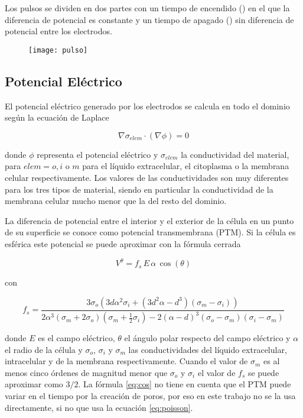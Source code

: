Los pulsos se dividen en dos partes con un tiempo de encendido (\ontime) en el que la diferencia de potencial es constante y un tiempo de apagado (\offtime) sin diferencia de potencial entre los electrodos.

\begin{figure}[h]
	\centering
	\texttt{[image: pulso]}
\end{figure}


\subsection*{Potencial Eléctrico}
El potencial eléctrico generado por los electrodos se calcula en todo el dominio según la ecuación de Laplace \cite[p.~88]{c9-fem-electro}

\begin{equation} \label{eq:poisson}
	\nabla \sigma_{elem} \cdot (\nabla \phi) = 0 
\end{equation}

donde $\phi$ representa el potencial eléctrico y $\sigma_{elem}$ la conductividad del material, para $elem = o, i$ o $m$ para el líquido extracelular, el citoplasma o la membrana celular respectivamente. Los valores de las conductividades son muy diferentes para los tres tipos de material, siendo en particular la conductividad de la membrana celular mucho menor que la del resto del dominio.

La diferencia de potencial entre el interior y el exterior de la célula en un punto de su superficie se conoce como potencial transmembrana (PTM). Si la célula es esférica este potencial se puede aproximar con la fórmula cerrada \cite{tsong}

\begin{equation} \label{eq:cos}
	 V^{\theta} = f_s\, E\, \alpha\, \cos (\theta) 
\end{equation}

con

\begin{equation} \label{eq:lambda}
    f_s = \frac{3\sigma_o \left( 3 d \alpha^2 \sigma_i + \left( 3 d^2 \alpha - d^3 \right) \left(\sigma_m - \sigma_i \right) \right)}{2 \alpha^3 \left( \sigma_m + 2 \sigma_o \right) \left(\sigma_m + \frac{1}{2} \sigma_i \right) - 2 \left(\alpha - d \right)^3 \left(\sigma_o - \sigma_m \right) \left( \sigma_i - \sigma_m \right)}
\end{equation}

donde $E$ es el campo eléctrico, $\theta$ el ángulo polar respecto del campo eléctrico y $\alpha$ el radio de la célula y $\sigma_o$, $\sigma_i$ y $\sigma_m$ las conductividades del líquido extracelular, intracelular y de la membrana respectivamente. Cuando el valor de $\sigma_m$ es al menos cinco órdenes de magnitud menor que $\sigma_o$ y $\sigma_i$ el valor de $f_s$ se puede aproximar como $3/2$\cite{c5-puchiar}. La fórmula \ref{eq:cos} no tiene en cuenta que el PTM puede variar en el tiempo por la creación de poros, por eso en este trabajo no se la usa directamente, si no que usa la ecuación \ref{eq:poisson}.

